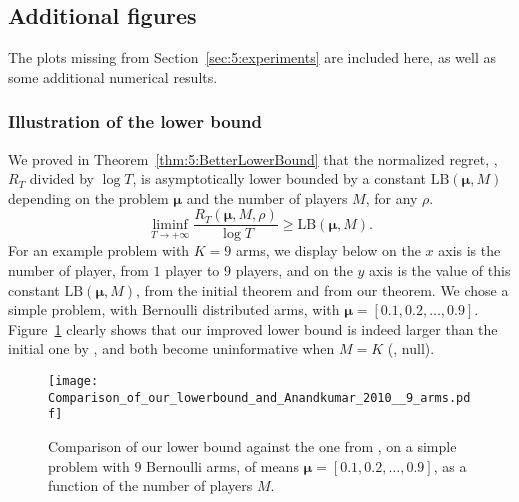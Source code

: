 \subsection{Additional figures}
\label{app:5:moreplots}

The plots missing from Section~\ref{sec:5:experiments} are included here,
as well as some additional numerical results.


\subsubsection{Illustration of the lower bound}
\label{app:5:illustrationLowerBound}


We proved in Theorem~\ref{thm:5:BetterLowerBound} that the normalized regret, \ie, $R_T$ divided by
$\log T$, is asymptotically lower bounded by a constant $\mathrm{LB}(\boldsymbol{\mu}, M)$
depending on the problem $\boldsymbol{\mu}$ and the number of players $M$, for any $\rho$.
\begin{equation}
  \mathop{\lim\inf}\limits_{T \to +\infty} \frac{R_T(\boldsymbol{\mu}, M, \rho)}{\log T} \geq \mathrm{LB}(\boldsymbol{\mu}, M).
\end{equation}
%
For an example problem with $K = 9$ arms, we display below on the $x$ axis is
the number of player, from $1$ player to $9$ players, and on the
$y$ axis is the value of this constant $\mathrm{LB}(\boldsymbol{\mu}, M)$, from the initial
theorem and from our theorem.
We chose a simple problem, with Bernoulli
distributed arms, with $\boldsymbol{\mu} = [0.1, 0.2, \dots, 0.9]$.
%
Figure~\ref{fig:5:CompLowerBounds} clearly shows that our improved lower bound is indeed larger than the initial one by \cite{Zhao10},
and both become uninformative when $M=K$ (\ie, null).

\begin{figure}[h!]
  \centering
  \texttt{[image: Comparison\_of\_our\_lowerbound\_and\_Anandkumar\_2010\_\_9\_arms.pdf]}
  \caption[Comparison of our lower bound against the one from \cite{Zhao10}]{Comparison of our lower bound against the one from \cite{Zhao10}, on a simple problem with $9$ Bernoulli arms, of means $\boldsymbol{\mu} = [0.1, 0.2, \dots, 0.9]$, as a function of the number of players $M$.}
  \label{fig:5:CompLowerBounds}
\end{figure}


